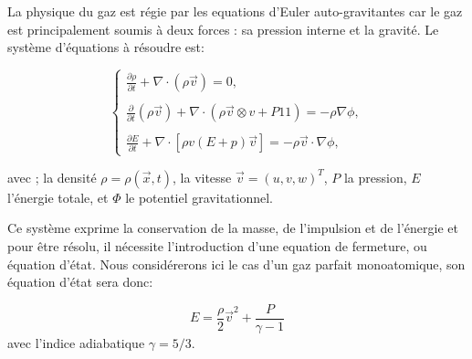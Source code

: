 La physique du gaz est régie par les equations d'Euler auto-gravitantes car le gaz est principalement soumis à deux forces : sa pression interne et la gravité.
Le système d'équations à résoudre est:

\begin{equation}
\begin{cases}

{ \frac{ \partial \rho }{ \partial t } + \nabla \cdot (\rho \vec{v}) = 0}, \\
\\
{ \frac{ \partial }{ \partial t } (\rho \vec{v}) + \nabla \cdot (\rho \vec{v} \otimes v + P1\!\!1 )  = -\rho\nabla \phi }, \\
\\
{ \frac{ \partial E }{ \partial t } + \nabla \cdot [ \rho v (E+p)\vec{v} ] = -\rho \vec{v} \cdot \nabla \phi },

\end{cases}
\end{equation}
\label{eq:hydro}

avec ;
la densité $\rho = \rho(\vec{x},t)$,
la vitesse $ \vec{v} = (u,v,w)^T$,
$P$ la pression, $E$ l’énergie totale, et $\Phi$ le potentiel gravitationnel.

Ce système exprime la conservation de la masse, de l'impulsion et de l'énergie et pour être résolu, il nécessite l'introduction d'une equation de fermeture, ou équation d'état.
Nous considérerons ici le cas d'un gaz parfait monoatomique, son équation d'état sera donc:

%
\begin{equation}
E = \frac{\rho}{2}\vec{v}^2 + \frac{P}{\gamma -1}
\end{equation}
avec l'indice adiabatique $\gamma = 5/3$.





